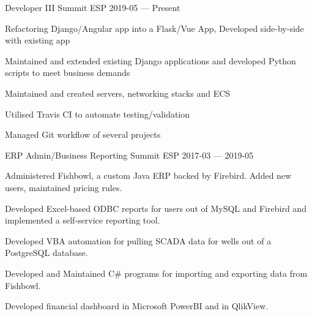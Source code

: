 


\begin{cventries}

  \cventry
    {Developer III} %
    {Summit ESP} %
    {} %
    {2019-05 — Present} %
    {
      \begin{cvitems} %
        \item {Refactoring Django/Angular app into a Flask/Vue App, Developed side-by-side with existing app}
        \item {Maintained and extended existing Django applications and developed Python scripts to meet business demands}
        \item {Maintained and created servers, networking stacks and ECS}
        \item {Utilised Travis CI to automate testing/validation}
        \item {Managed Git workflow of several projects}
      \end{cvitems}
    }


  \cventry
    {ERP Admin/Business Reporting} %
    {Summit ESP} %
    {} %
    {2017-03 — 2019-05} %
    {
      \begin{cvitems} %
        \item {Administered Fishbowl, a custom Java ERP backed by Firebird. Added new users, maintained pricing rules.}
        \item {Developed Excel-based ODBC reports for users out of MySQL and Firebird and implemented a self-service reporting tool.}
        \item {Developed VBA automation for pulling SCADA data for wells out of a PostgreSQL database.}
        \item {Developed and Maintained C\# programs for importing and exporting data from Fishbowl.}
        \item {Developed financial dashboard in Microsoft PowerBI and in QlikView.}
      \end{cvitems}
    }



\end{cventries}
